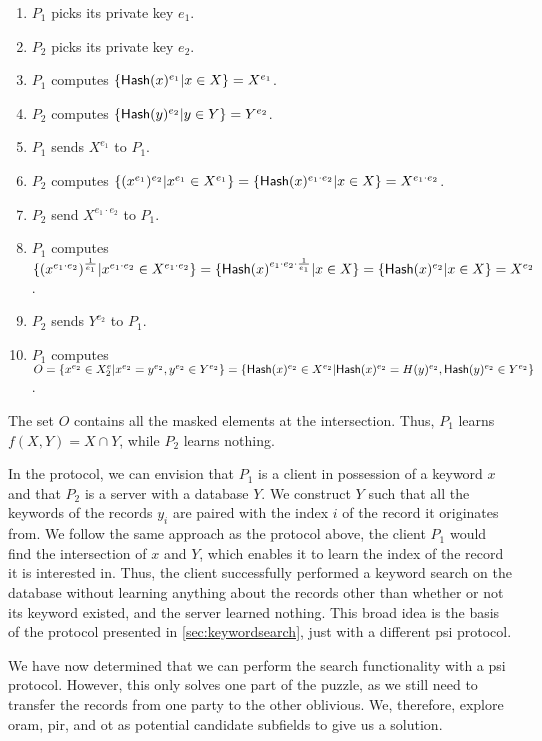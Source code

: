 \begin{enumerate}
    \item $ P_1 $ picks its private key $ e_1 $.
    \item $ P_2 $ picks its private key $ e_2 $.
    \item $ P_1 $ computes $ \lbrace \mathsf{Hash}(x)^{e_1} \vert x \in X \rbrace = X^{e_1} $.
    \item $ P_2 $ computes $ \lbrace \mathsf{Hash}(y)^{e_2} \vert y \in Y \rbrace = Y^{e_2} $.
    \item $ P_1 $ sends $ X^{e_1} $ to $ P_1 $.
    \item $ P_2 $ computes $ \lbrace (x^{e_1})^{e_2} \vert x^{e_1} \in X^{e_1} \rbrace = \lbrace \mathsf{Hash}(x)^{e_1 \cdot e_2} \vert x \in X \rbrace = X^{e_1 \cdot e_2} $.
    \item $ P_2 $ send $ X^{e_1 \cdot e_2} $ to $ P_1 $.
    \item $ P_1 $ computes $ \lbrace (x^{e_1 \cdot e_2})^{\frac{1}{e_1}} \vert x^{e_1 \cdot e_2} \in X^{e_1 \cdot e_2} \rbrace = \lbrace \mathsf{Hash}(x)^{e_1 \cdot e_2 \cdot \frac{1}{e_1}} \vert x \in X \rbrace = \lbrace \mathsf{Hash}(x)^{e_2} \vert x \in X \rbrace = X^{e_2} $.
    \item $ P_2 $ sends $ Y^{e_2} $ to $ P_1 $.
    \item $ P_1 $ computes $ O = \lbrace x^{e_2} \in X^e_2 \vert x^{e_2} = y^{e_2}, y^{e_2} \in Y^{e_2} \rbrace = \lbrace \mathsf{Hash}(x)^{e_2} \in X^{e_2} \vert \mathsf{Hash}(x)^{e_2} = H(y)^{e_2} , \mathsf{Hash}(y)^{e_2} \in Y^{e_2} \rbrace $.
\end{enumerate}

The set $ O $ contains all the masked elements at the intersection. Thus, $ P_1 $ learns $ f(X,Y) = X \cap Y $, while $ P_2 $ learns nothing.

In the protocol, we can envision that $ P_1 $ is a client in possession of a keyword $ x $ and that $ P_2 $ is a server with a database $ Y $. We construct $ Y $ such that all the keywords of the records $ y_i $ are paired with the index $ i $ of the record it originates from. We follow the same approach as the protocol above, the client $ P_1 $ would find the intersection of $ x $ and $ Y $, which enables it to learn the index of the record it is interested in. Thus, the client successfully performed a keyword search on the database without learning anything about the records other than whether or not its keyword existed, and the server learned nothing. This broad idea is the basis of the protocol presented in \cref{sec:keywordsearch}, just with a different \acrshort{psi} protocol.

We have now determined that we can perform the search functionality with a \acrshort{psi} protocol. However, this only solves one part of the puzzle, as we still need to transfer the records from one party to the other oblivious. We, therefore, explore \acrshort{oram}, \acrshort{pir}, and \acrshort{ot} as potential candidate subfields to give us a solution. 
